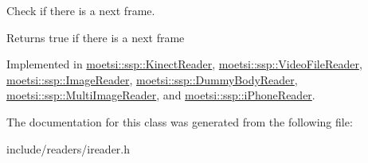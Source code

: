 Check if there is a next frame. 

\begin{DoxyReturn}{Returns}
true if there is a next frame 
\end{DoxyReturn}


Implemented in \hyperlink{classmoetsi_1_1ssp_1_1KinectReader_a08934b6eff437142e482bb21780ca171}{moetsi\+::ssp\+::\+Kinect\+Reader}, \hyperlink{classmoetsi_1_1ssp_1_1VideoFileReader_ab5733b56b6d6dd7596eac9d914481c7e}{moetsi\+::ssp\+::\+Video\+File\+Reader}, \hyperlink{classmoetsi_1_1ssp_1_1ImageReader_ad8e87720ca0ec97de501f1070119b28d}{moetsi\+::ssp\+::\+Image\+Reader}, \hyperlink{classmoetsi_1_1ssp_1_1DummyBodyReader_ab91b3c2ccdba21bae040340c34361595}{moetsi\+::ssp\+::\+Dummy\+Body\+Reader}, \hyperlink{classmoetsi_1_1ssp_1_1MultiImageReader_a04240c98d28d8949fca4ecdcb04f04f5}{moetsi\+::ssp\+::\+Multi\+Image\+Reader}, and \hyperlink{classmoetsi_1_1ssp_1_1iPhoneReader_a35ca55a03a9fb7b559f9381b11f53bfe}{moetsi\+::ssp\+::i\+Phone\+Reader}.



The documentation for this class was generated from the following file\+:\begin{DoxyCompactItemize}
\item 
include/readers/ireader.\+h\end{DoxyCompactItemize}
